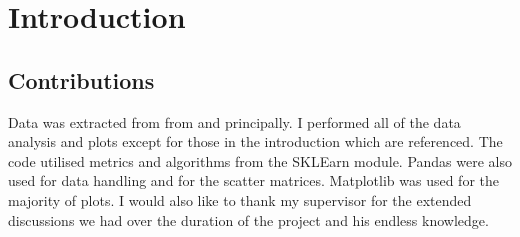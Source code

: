 
\chapter{Introduction}


\section{Contributions}
Data was extracted from from \cite{Cappellari2011} and \cite{Krajnovic2013} principally. I performed all of the data analysis and plots except for those in the introduction which are referenced. The code utilised metrics and algorithms from the SKLEarn module. Pandas were also used for data handling and for the scatter matrices. Matplotlib was used for the majority of plots. I would also like to thank my supervisor for the extended discussions we had over the duration of the project and his endless knowledge.

